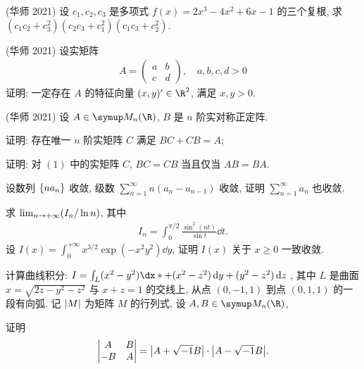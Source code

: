 \begin{exercise}[resume=exer]
      \item (华师 2021) 设 $ c_{1}, c_{2}, c_{3} $ 是多项式 $ f(x) = 2x^{3} - 4x^{2} + 6x - 1 $ 的三个复根, 求 $ (c_{1}c_{2} + c_{3}^{2})(c_{2}c_{3} + c_{1}^{2})(c_{1}c_{3} + c_{2}^{2}) $.
      \item (华师 2021) 设实矩阵
      \begin{align*}
          A = \begin{pmatrix}
              a & b \\ c & d
          \end{pmatrix},\quad a, b, c, d > 0
      \end{align*}
      证明: 一定存在 $ A $ 的特征向量 $ (x, y)'\in \R^{2} $, 满足 $ x, y > 0 $.
      \item (华师 2021) 设 $ A \in \MM $, $ B $ 是 $ n $ 阶实对称正定阵.
      \begin{exercise}
          \item 证明: 存在唯一 $ n $ 阶实矩阵 $ C $ 满足 $ BC + CB = A $;
          \item 证明: 对 $ (1) $ 中的实矩阵 $ C $, $ BC = CB $ 当且仅当 $ AB = BA $.
      \end{exercise}
      \item 设数列 $ \qty{na_{n}} $ 收敛, 级数 $ \sum_{n=1}^{\infty}n(a_{n} - a_{n-1}) $ 收敛, 证明 $ \sum_{n=1}^{\infty}a_{n} $ 也收敛.
      \item 求 $ \lim_{n \to +\infty} (I_{n}/\ln n) $, 其中
      \begin{align*}
          I_{n} = \int_{0}^{\pi/2} \frac{\sin^{2}(nt)}{\sin t}\dd{t}.
      \end{align*}
      \sitem 设 $ I(x) = \int_{0}^{+\infty} x^{3/2}\exp(-x^{2}y^{2})\dd{y} $, 证明 $ I(x) $ 关于 $ x\geq 0 $ 一致收敛.
      \item 计算曲线积分: $ I = \int_{L} (x^{2} - y^{2}) \dx* + (x^{2} - z^{2}) \dd{y} + (y^{2} - z^{2})\dd{z} $ , 其中 $ L $ 是曲面 $ x = \sqrt{2z - y^{2} - z^{2}} $ 与 $ x + z = 1 $ 的交线上, 从点 $ (0, -1, 1) $ 到点 $ (0, 1, 1) $ 的一段有向弧.
      \sitem 记 $ \abs{M} $ 为矩阵 $ M $ 的行列式, 设 $ A, B\in \MM $,
      \begin{exercise}
          \item 证明
          \begin{align*}
              \begin{vmatrix}
                  A & B \\ -B & A
              \end{vmatrix} = \abs{A + \sqrt{-1}B}\cdot\abs{A - \sqrt{-1}B}.
          \end{align*}

\end{exercise}
\end{exercise}
